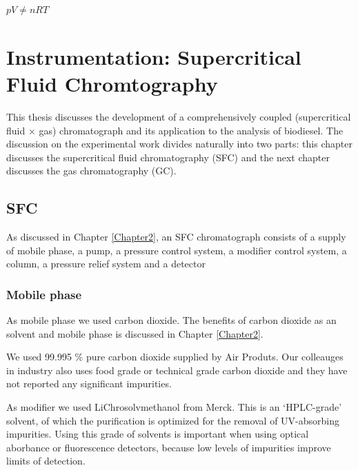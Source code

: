 
\begin{savequote}[45mm]
$pV \neq nRT$ 
\end{savequote}

\chapter{Instrumentation: Supercritical Fluid Chromtography} %

\label{Chapter4} %

This thesis discusses the development of a comprehensively coupled
(supercritical fluid × gas) chromatograph and its application to the analysis of
biodiesel. The discussion on the experimental work divides naturally into two
parts: this chapter discusses the supercritical fluid chromatography (SFC) and
the next chapter discusses the gas chromatography (GC).

\section{SFC}

As discussed in Chapter \ref{Chapter2}, an SFC chromatograph consists of a
supply of mobile phase, a pump, a pressure control system, a modifier control
system, a column, a pressure relief system and a detector

\subsection{Mobile phase}

As mobile phase we used carbon dioxide. The benefits of carbon dioxide as an
solvent and mobile phase is discussed in Chapter \ref{Chapter2}.

We used 99.995 \% pure carbon dioxide supplied by Air Produts. Our colleauges in
industry also uses food grade or technical grade carbon dioxide and they have
not reported any significant impurities.

As modifier we used LiChrosolv\textregistered methanol from Merck. This is an
`HPLC-grade' solvent, of which the purification is optimized for the removal of
UV-absorbing impurities. Using this grade of solvents is important when using
optical aborbance or fluorescence detectors, because low levels of impurities
improve limits of detection.

